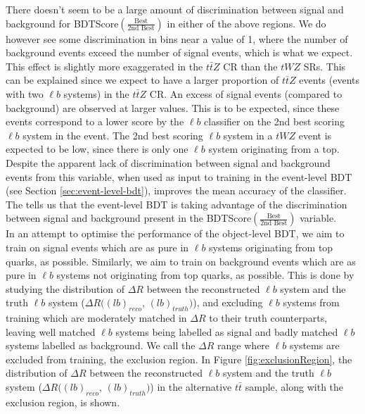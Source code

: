 There doesn't seem to be a large amount of discrimination between signal and background for BDTScore$(\frac{\text{Best}}{\text{2nd Best}})$ in either of the above regions. We do however see some discrimination in bins near a value of 1, where the number of background events exceed the number of signal events, which is what we expect. This effect is slightly more exaggerated in the $t\bar{t}Z$ CR than the $tWZ$ SRs. This can be explained since we expect to have a larger proportion of $t\bar{t}Z$ events (events with two $\ell b$ systems) in the $t\bar{t}Z$ CR. An excess of signal events (compared to background) are observed at larger values. This is to be expected, since these events correspond to a lower score by the $\ell b$ classifier on the 2nd best scoring $\ell b$ system in the event. The 2nd best scoring $\ell b$ system in a $tWZ$ event is expected to be low, since there is only one $\ell b$ system originating from a top. Despite the apparent lack of discrimination between signal and background events from this variable, when used as input to training in the event-level BDT (see Section \ref{sec:event-level-bdt}), improves the mean accuracy of the classifier. The tells us that the event-level BDT is taking advantage of the discrimination between signal and background present in the BDTScore$(\frac{\text{Best}}{\text{2nd Best}})$ variable.\\

In an attempt to optimise the performance of the object-level BDT, we aim to train on signal events which are as pure in $\ell b$ systems originating from top quarks, as possible. Similarly, we aim to train on background events which are as pure in $\ell b$ systems not originating from top quarks, as possible. This is done by studying the distribution of $\Delta R$ between the reconstructed $\ell b$ system and the truth $\ell b$ system ($\Delta R((lb)_{reco}$, $(lb)_{truth})$), and excluding $\ell b$ systems from training which are moderately matched in $\Delta R$ to their truth counterparts, leaving well matched $\ell b$ systems being labelled as signal and badly matched $\ell b$ systems labelled as background. We call the $\Delta R$ range where $\ell b$ systems are excluded from training, the exclusion region. In Figure \ref{fig:exclusionRegion}, the distribution of $\Delta R$ between the reconstructed $\ell b$ system and the truth $\ell b$ system ($\Delta R((lb)_{reco}$, $(lb)_{truth})$) in the alternative $t\bar{t}$ sample, along with the exclusion region, is shown.

